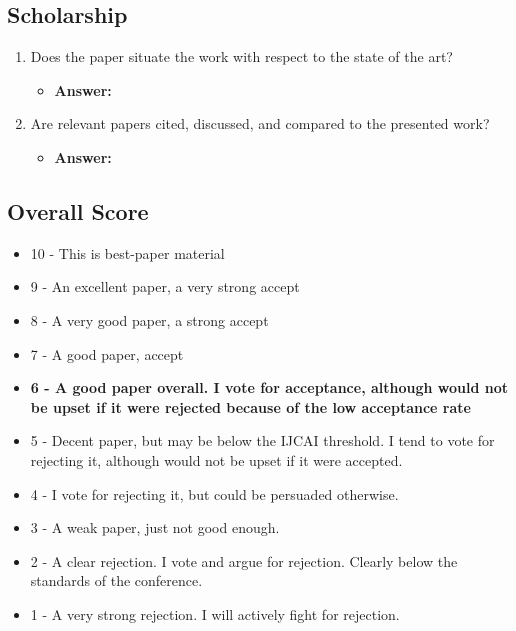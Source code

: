 \documentclass[a4paper]{article}
\begin{document}
\subsection{Scholarship}

\begin{enumerate}[label=(\alph*)]
	\item Does the paper situate the work with respect to the state of the art?
		\begin{itemize}
			\item \textbf{Answer:}	
		\end{itemize}			
	
	
	\item Are relevant papers cited, discussed, and compared to the presented work?
		\begin{itemize}
			\item \textbf{Answer:}	
		\end{itemize}			
	
\end{enumerate}

\subsection{Overall Score}

\begin{itemize}
	\item 10 - This is best-paper material
	\item 9 - An excellent paper, a very strong accept
	\item 8 - A very good paper, a strong accept
	\item 7 - A good paper, accept
	\item \textbf{6 - A good paper overall. I vote for acceptance, although would not be upset if it were rejected because of the low acceptance rate}
	\item 5 - Decent paper, but may be below the IJCAI threshold. I tend to vote for rejecting it, although would not be upset if it were accepted.
	\item 4 - I vote for rejecting it, but could be persuaded otherwise.
	\item 3 - A weak paper, just not good enough.
	\item 2 - A clear rejection. I vote and argue for rejection. Clearly below the standards of the conference.
	\item 1 - A very strong rejection. I will actively fight for rejection.
\end{itemize}
\end{document}
